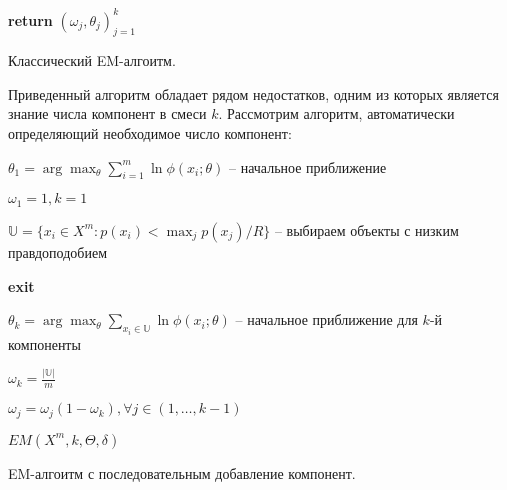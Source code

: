 \documentclass[12pt,a4paper]{report}
\begin{document}
\begin{algorithm}[H]
\SetAlgoLined
{}

\textbf{return} $(\omega_j, \theta_j)_{j=1}^k$
\caption{Классический EM-алгоитм.}
\label{alg:EM}
\end{algorithm}

Приведенный алгоритм обладает рядом недостатков, одним из которых является знание числа компонент в смеси  $k$. Рассмотрим алгоритм, автоматически определяющий необходимое число компонент:

\begin{algorithm}[H]
\SetAlgoLined
{}

$\theta_1 =  \arg \max_{\theta} \sum_{i=1}^{m} \ln\phi(x_i; \theta)$ -- начальное приближение

$\omega_1 = 1, k = 1$

 {
	$\mathbb{U} = \{x_i \in X^m: p(x_i) < \max_j p(x_j) / R\}$ -- выбираем объекты с низким правдоподобием
	
	 {
		\textbf{exit}
	}
	
	$\theta_k =  \arg \max_{\theta} \sum_{x_i \in \mathbb{U}} \ln\phi(x_i; \theta)$ -- начальное приближение для $k$-й компоненты
	
	$\omega_k = \frac{|\mathbb{U}|}{m}$
	
	$\omega_j = \omega_j(1-\omega_k), \forall j \in (1, \dots, k-1)$
	
	$EM(X^m, k, \Theta, \delta)$
}
\caption{EM-алгоитм с последовательным добавление компонент.}
\label{alg:KEM}
\end{algorithm}
\end{document}
